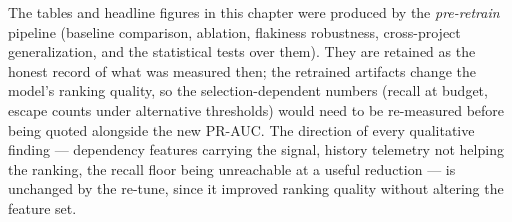 The tables and headline figures in this chapter were produced by the \emph{pre-retrain} pipeline
(baseline comparison, ablation, flakiness robustness, cross-project generalization, and the statistical
tests over them). They are retained as the honest record of what was measured then; the retrained
artifacts change the model's ranking quality, so the selection-dependent numbers (recall at budget,
escape counts under alternative thresholds) would need to be re-measured before being quoted alongside
the new PR-AUC. The direction of every qualitative finding --- dependency features carrying the signal,
history telemetry not helping the ranking, the recall floor being unreachable at a useful reduction ---
is unchanged by the re-tune, since it improved ranking quality without altering the feature set.
